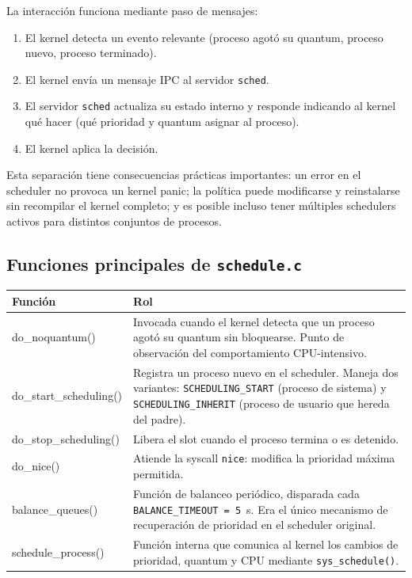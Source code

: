 \documentclass[11pt,a4paper]{article}
\begin{document}
La interacci\'on funciona mediante paso de mensajes:

\begin{enumerate}[leftmargin=*]
  \item El kernel detecta un evento relevante (proceso agot\'o su quantum, proceso
        nuevo, proceso terminado).
  \item El kernel env\'ia un mensaje IPC al servidor \texttt{sched}.
  \item El servidor \texttt{sched} actualiza su estado interno y responde indicando al
        kernel qu\'e hacer (qu\'e prioridad y quantum asignar al proceso).
  \item El kernel aplica la decisi\'on.
\end{enumerate}

Esta separaci\'on tiene consecuencias pr\'acticas importantes: un error en el scheduler
no provoca un kernel panic; la pol\'itica puede modificarse y reinstalarse sin recompilar
el kernel completo; y es posible incluso tener m\'ultiples schedulers activos para
distintos conjuntos de procesos.

\subsection{Funciones principales de \texttt{schedule.c}}

\begin{longtable}{>{\ttfamily\raggedright\arraybackslash}p{4.2cm}
                  >{\raggedright\arraybackslash}p{9.3cm}}
\toprule
\normalfont\textbf{Funci\'on} & \textbf{Rol} \\
\midrule
\endhead
do\_noquantum() &
  Invocada cuando el kernel detecta que un proceso agot\'o su quantum sin
  bloquearse. Punto de observaci\'on del comportamiento CPU-intensivo. \\[4pt]
do\_start\_scheduling() &
  Registra un proceso nuevo en el scheduler. Maneja dos variantes:
  \texttt{SCHEDULING\_START} (proceso de sistema) y
  \texttt{SCHEDULING\_INHERIT} (proceso de usuario que hereda del padre). \\[4pt]
do\_stop\_scheduling() &
  Libera el slot cuando el proceso termina o es detenido. \\[4pt]
do\_nice() &
  Atiende la syscall \texttt{nice}: modifica la prioridad m\'axima permitida. \\[4pt]
balance\_queues() &
  Funci\'on de balanceo peri\'odico, disparada cada
  \texttt{BALANCE\_TIMEOUT = 5}~s. Era el \'unico mecanismo de recuperaci\'on
  de prioridad en el scheduler original. \\[4pt]
schedule\_process() &
  Funci\'on interna que comunica al kernel los cambios de prioridad, quantum
  y CPU mediante \texttt{sys\_schedule()}. \\
\bottomrule
\end{longtable}
\end{document}
